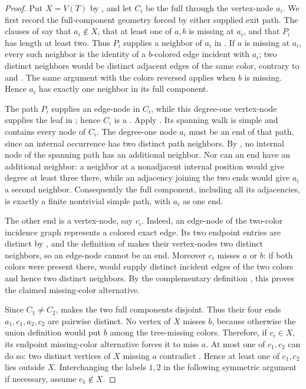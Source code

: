 \begin{proof}
Put $X=V(T)$ by , and let $C_i$ be the
full  through the vertex-node $a_i$.  We first
record the full-component geometry forced by either supplied exit path.
The clauses of  say that $a_i\notin X$, that at
least one of $a,b$ is missing at $a_i$, and that $P_i$ has length at
least two.  Thus $P_i$ supplies a neighbor of $a_i$ in
.  If $a$ is missing at $a_i$, every such
neighbor is the identity of a $b$-colored edge incident with $a_i$; two
distinct neighbors would be distinct adjacent edges of the same color,
contrary to  and
.  The same argument with the colors
reversed applies when $b$ is missing.  Hence $a_i$ has exactly one
neighbor in its full component.

The path $P_i$ supplies an edge-node in $C_i$, while this degree-one
vertex-node supplies the leaf in ; hence
$C_i$ is a .  Apply
.  Its spanning walk is simple and
contains every node of $C_i$.  The degree-one node $a_i$ must be an end
of that path, since an internal occurrence has two distinct path
neighbors.  By
, no internal node of the
spanning path has an additional neighbor.  Nor can an end have an
additional neighbor: a neighbor at a nonadjacent internal position would
give degree at least three there, while an adjacency joining the two ends
would give $a_i$ a second neighbor.  Consequently the full component, including all
its adjacencies, is exactly a finite nontrivial simple path, with $a_i$ as
one end.

The other end is a vertex-node, say $c_i$.  Indeed, an edge-node of the
two-color incidence graph represents a colored exact edge.  Its two
endpoint entries are distinct by , and the
definition of  makes their vertex-nodes two distinct
neighbors, so an edge-node cannot be an end.  Moreover $c_i$ misses $a$
or $b$: if both colors were present there,  would
supply distinct incident edges of the two colors and hence two distinct
neighbors.  By the complementary definition ,
this proves the claimed missing-color alternative.

Since $C_1\ne C_2$,  makes the two
full components disjoint.  Thus their four ends $a_1,c_1,a_2,c_2$ are
pairwise distinct.  No vertex of $X$ misses $b$, because otherwise the
union definition  would put $b$ among the
tree-missing colors.  Therefore, if $c_i\in X$, its endpoint
missing-color alternative forces it to miss $a$.  At most one of
$c_1,c_2$ can do so: two distinct vertices of $X$ missing $a$ contradict
.  Hence at least one of $c_1,c_2$
lies outside $X$.  Interchanging the labels $1,2$ in the following
symmetric argument if necessary, assume $c_1\notin X$.


\end{proof}
